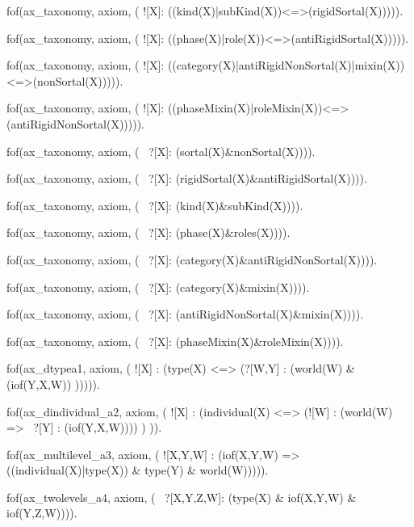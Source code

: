 fof(ax_taxonomy, axiom, (
![X]: ((kind(X)|subKind(X))<=>(rigidSortal(X))))).

fof(ax_taxonomy, axiom, (
![X]: ((phase(X)|role(X))<=>(antiRigidSortal(X))))).

fof(ax_taxonomy, axiom, (
![X]: ((category(X)|antiRigidNonSortal(X)|mixin(X))<=>(nonSortal(X))))).

fof(ax_taxonomy, axiom, (
![X]: ((phaseMixin(X)|roleMixin(X))<=>(antiRigidNonSortal(X))))).



fof(ax_taxonomy, axiom, (
    ~?[X]: (sortal(X)&nonSortal(X)))).

fof(ax_taxonomy, axiom, (
    ~?[X]: (rigidSortal(X)&antiRigidSortal(X)))).

fof(ax_taxonomy, axiom, (
        ~?[X]: (kind(X)&subKind(X)))).

fof(ax_taxonomy, axiom, (
        ~?[X]: (phase(X)&roles(X)))).

fof(ax_taxonomy, axiom, (
        ~?[X]: (category(X)&antiRigidNonSortal(X)))).

fof(ax_taxonomy, axiom, (
        ~?[X]: (category(X)&mixin(X)))).

fof(ax_taxonomy, axiom, (
        ~?[X]: (antiRigidNonSortal(X)&mixin(X)))).

fof(ax_taxonomy, axiom, (
      ~?[X]: (phaseMixin(X)&roleMixin(X)))).



%
%

fof(ax_dtypea1, axiom, (
    ![X] : (type(X) <=> (?[W,Y] : (world(W) & (iof(Y,X,W))
    ))))).


fof(ax_dindividual_a2, axiom, (
        ![X] : (individual(X) <=> (![W] : (world(W) => ~?[Y] : (iof(Y,X,W)))) )
        )).

fof(ax_multilevel_a3, axiom, (
    ![X,Y,W] : (iof(X,Y,W) => ((individual(X)|type(X)) & type(Y) & world(W))))).

fof(ax_twolevels_a4, axiom, (
        ~?[X,Y,Z,W]: (type(X) & iof(X,Y,W) & iof(Y,Z,W)))).




